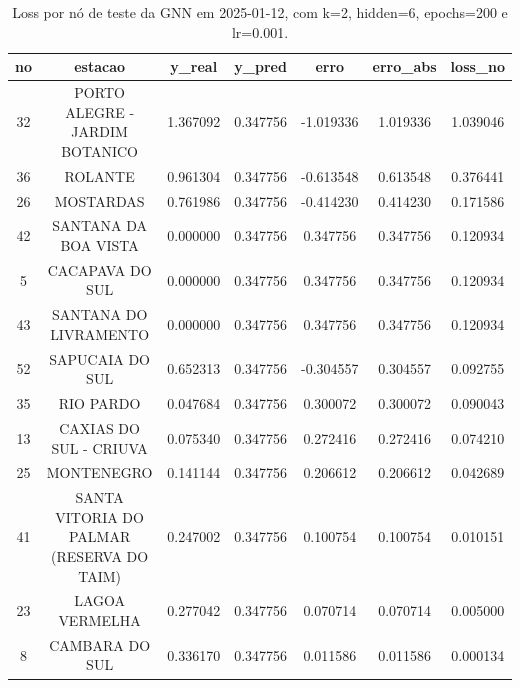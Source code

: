 \begin{table}[h]
\centering
\caption{Loss por nó de teste da GNN em 2025-01-12, com k=2, hidden=6, epochs=200 e lr=0.001.}
\label{tab:gnn_loss_nodes_k2_hidden6}
\begin{tabular}{ccccccc}
\toprule
no & estacao & y\_real & y\_pred & erro & erro\_abs & loss\_no \\
\midrule
32 & PORTO ALEGRE - JARDIM BOTANICO & 1.367092 & 0.347756 & -1.019336 & 1.019336 & 1.039046 \\
36 & ROLANTE & 0.961304 & 0.347756 & -0.613548 & 0.613548 & 0.376441 \\
26 & MOSTARDAS & 0.761986 & 0.347756 & -0.414230 & 0.414230 & 0.171586 \\
42 & SANTANA DA BOA VISTA & 0.000000 & 0.347756 & 0.347756 & 0.347756 & 0.120934 \\
5 & CACAPAVA DO SUL & 0.000000 & 0.347756 & 0.347756 & 0.347756 & 0.120934 \\
43 & SANTANA DO LIVRAMENTO & 0.000000 & 0.347756 & 0.347756 & 0.347756 & 0.120934 \\
52 & SAPUCAIA DO SUL & 0.652313 & 0.347756 & -0.304557 & 0.304557 & 0.092755 \\
35 & RIO PARDO & 0.047684 & 0.347756 & 0.300072 & 0.300072 & 0.090043 \\
13 & CAXIAS DO SUL - CRIUVA & 0.075340 & 0.347756 & 0.272416 & 0.272416 & 0.074210 \\
25 & MONTENEGRO & 0.141144 & 0.347756 & 0.206612 & 0.206612 & 0.042689 \\
41 & SANTA VITORIA DO PALMAR (RESERVA DO TAIM) & 0.247002 & 0.347756 & 0.100754 & 0.100754 & 0.010151 \\
23 & LAGOA VERMELHA & 0.277042 & 0.347756 & 0.070714 & 0.070714 & 0.005000 \\
8 & CAMBARA DO SUL & 0.336170 & 0.347756 & 0.011586 & 0.011586 & 0.000134 \\
\bottomrule
\end{tabular}
\end{table}
